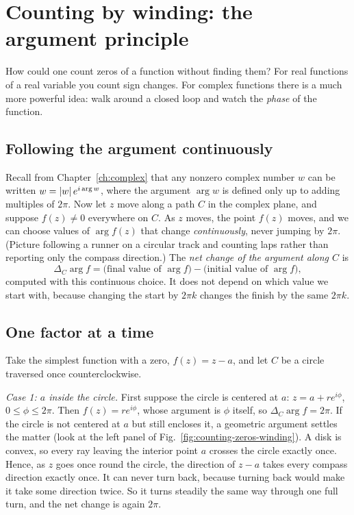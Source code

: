 \section{Counting by winding: the argument principle}\label{sec:counting-zeros-winding}

How could one count zeros of a function without finding them? For real functions of a real variable you count sign changes. For complex functions there is a much more powerful idea: walk around a closed loop and watch the \emph{phase} of the function.

\subsection{Following the argument continuously}

Recall from Chapter~\ref{ch:complex} that any nonzero complex number $w$ can be written $w=\left\lvert w\right\rvert e^{i\arg w}$, where the argument $\arg w$ is defined only up to adding multiples of $2\pi$. Now let $z$ move along a path $C$ in the complex plane, and suppose $f(z)\neq0$ everywhere on $C$. As $z$ moves, the point $f(z)$ moves, and we can choose values of $\arg f(z)$ that change \emph{continuously}, never jumping by $2\pi$. (Picture following a runner on a circular track and counting laps rather than reporting only the compass direction.) The \emph{net change of the argument along $C$} is
\begin{equation}
\Delta_C\arg f=\bigl(\text{final value of }\arg f\bigr)-\bigl(\text{initial value of }\arg f\bigr),
\label{eq:counting-zeros-deltaarg}
\end{equation}
computed with this continuous choice. It does not depend on which value we start with, because changing the start by $2\pi k$ changes the finish by the same $2\pi k$.

\subsection{One factor at a time}

Take the simplest function with a zero, $f(z)=z-a$, and let $C$ be a circle traversed once counterclockwise.

\emph{Case 1: $a$ inside the circle.} First suppose the circle is centered at $a$: $z=a+re^{i\phi}$, $0\le\phi\le2\pi$. Then $f(z)=re^{i\phi}$, whose argument is $\phi$ itself, so $\Delta_C\arg f=2\pi$. If the circle is not centered at $a$ but still encloses it, a geometric argument settles the matter (look at the left panel of Fig.~\ref{fig:counting-zeros-winding}). A disk is convex, so every ray leaving the interior point $a$ crosses the circle exactly once. Hence, as $z$ goes once round the circle, the direction of $z-a$ takes every compass direction exactly once. It can never turn back, because turning back would make it take some direction twice. So it turns steadily the same way through one full turn, and the net change is again $2\pi$.

